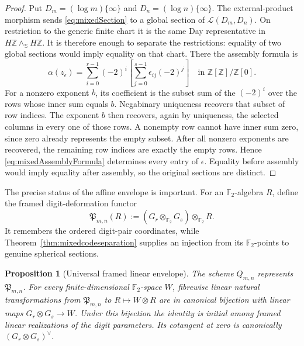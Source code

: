 \documentclass[11pt]{amsart}
\newtheorem{proposition}[theorem]{Proposition}
\theoremstyle{definition}
\theoremstyle{remark}
\newcommand{\Z}{\mathbb Z}
\begin{document}
\begin{proof}
Put $D_m=(\log m)\{\infty\}$ and $D_n=(\log n)\{\infty\}$.  The
external-product morphism sends \eqref{eq:mixedSection} to a global
section of $\mathcal L(D_m,D_n)$.  On restriction to the generic finite chart it
is the same Day representative in $H\Z\wedge_{\mathbb S}H\Z$.  It is
therefore enough to separate the restrictions: equality of two global
sections would imply equality on that chart.  There the assembly formula is
\begin{equation}\label{eq:mixedAssemblyFormula}
 \alpha(z_\epsilon)=
 \sum_{i=0}^{r-1}(-2)^i
 \left[\sum_{j=0}^{s-1}\epsilon_{ij}(-2)^j\right]
 \quad\text{in }\Z[\Z]/\Z[0].
\end{equation}
For a nonzero exponent $b$, its coefficient is the subset sum of the
$(-2)^i$ over the rows whose inner sum equals $b$.  Negabinary uniqueness
recovers that subset of row indices.  The exponent $b$ then recovers, again
by uniqueness, the selected columns in every one of those rows.  A nonempty
row cannot have inner sum zero, since zero already represents the empty
subset.  After all nonzero exponents are recovered, the remaining row
indices are exactly the empty rows.  Hence \eqref{eq:mixedAssemblyFormula}
determines every entry of $\epsilon$.  Equality before assembly would imply
equality after assembly, so the original sections are distinct.
\end{proof}

The precise status of the affine envelope is important.  For an
$\mathbb F_2$-algebra $R$, define the framed digit-deformation functor
\begin{equation}\label{eq:digitDeformationFunctor}
 \mathfrak P_{m,n}(R):=(G_r\otimes_{\mathbb F_2}G_s)
                       \otimes_{\mathbb F_2}R.
\end{equation}
It remembers the ordered digit-pair coordinates, while
Theorem~\ref{thm:mixedcodeseparation} supplies an injection from its
$\mathbb F_2$-points to genuine spherical sections.

\begin{proposition}[Universal framed linear envelope]
\label{prop:universalCodeEnvelope}
The scheme $Q_{m,n}$ represents $\mathfrak P_{m,n}$.  For every
finite-dimensional $\mathbb F_2$-space $W$, fibrewise linear natural
transformations from $\mathfrak P_{m,n}$ to $R\mapsto W\otimes R$ are in
canonical bijection with linear maps $G_r\otimes G_s\to W$.  Under this
bijection the identity is initial among framed linear realizations of the
digit parameters.  Its cotangent at zero is canonically
$(G_r\otimes G_s)^\vee$.
\end{proposition}
\end{document}
